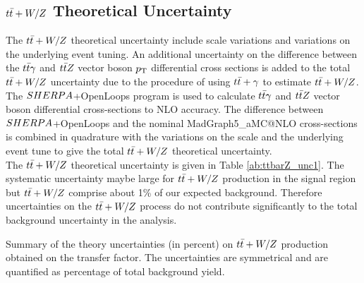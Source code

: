 \begin{table}[!h]
\begin{center}
    \end{center}
    \caption{Summary of the single-top (ST) theory uncertainties obtained in each of the signal regions. The uncertainties are computed according to the variation on the transfer factor defined in equation \ref{eq:theory_uncertainty}. The uncertainties are symmetrical and are quantified as percentage of total background yield. %
}
    \label{tab:single_top_unc3}
  \end{table}


\subsection{$t\bar{t}+W/Z$ Theoretical Uncertainty}

\indent The $t\bar{t}+W/Z$ theoretical uncertainty include scale variations and variations on the underlying event tuning.  An additional uncertainty on the difference between the $t\bar{t}\gamma$ and $t\bar{t} Z$ vector boson $p_{\mathrm{T}}$ differential cross sections is added to the total $t\bar{t}+W/Z$ uncertainty due to the procedure of using $t\bar{t}+\gamma$ to estimate $t\bar{t}+W/Z$.  The $SHERPA$+OpenLoops program\cite{OpenLoops} is used to calculate $t\bar{t} \gamma$ and $t\bar{t} Z$ vector boson differential cross-sections to NLO accuracy.  The difference between $SHERPA$+OpenLoops and the nominal {\sc MadGraph5\_aMC\/@NLO} cross-sections is combined in quadrature with the variations on the scale and the underlying event tune to give the total $t\bar{t}+W/Z$ theoretical uncertainty. \\

\indent The $t\bar{t}+W/Z$ theoretical uncertainty is given in Table \ref{ab:ttbarZ_unc1}.  The systematic uncertainty maybe large for $t\bar{t}+W/Z$ production in the signal region but $t\bar{t}+W/Z$ comprise about 1\% of our expected background. Therefore uncertainties on the $t\bar{t}+W/Z$  process do not contribute significantly to the total background uncertainty in the analysis. \\

  \begin{table}[!h]
    \begin{center} \footnotesize
      
    \end{center}
    \caption{Summary of the theory uncertainties (in percent) on $t\bar{t}+W/Z$ production obtained on the transfer factor. The uncertainties are symmetrical and are quantified as percentage of total background yield.}
    \label{tab:ttbarZ_unc1}
  \end{table}

